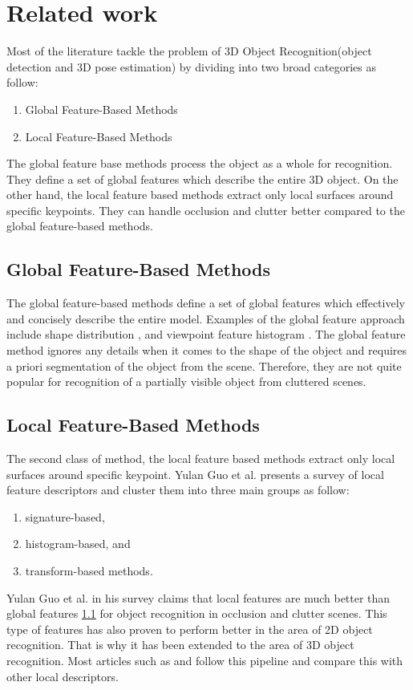 
\chapter{Related work}
\label{chap:relwork}

Most of the literature tackle the problem of 3D Object Recognition(object detection and 3D pose estimation) by dividing into two broad categories as follow:
\begin{enumerate}
\item Global Feature-Based Methods
\item Local Feature-Based Methods
\end{enumerate}

The global feature base methods process the object as a whole for recognition. They define a set of global features which describe the entire 3D object.
On the other hand, the local feature based methods extract only local surfaces around specific keypoints. They can handle occlusion and clutter better compared to the global feature-based methods.


\section{Global Feature-Based Methods} \label{global}
The global feature-based methods define a set of global features which effectively and concisely describe the entire model. Examples of the global feature approach include shape distribution \cite{shapedist}, and viewpoint feature histogram \cite{vfh}.
The global feature method ignores any details when it comes to the shape of the object and requires a priori segmentation of the object from the scene. 
Therefore, they are not quite popular for recognition of a partially visible object from cluttered scenes. 

\section{Local Feature-Based Methods}

The second class of method, the local feature based methods extract only local surfaces around specific keypoint. Yulan Guo et al. \cite{survey} presents a survey of local feature descriptors and cluster them into three main groups as follow:
\begin{enumerate}
\item signature-based,
\item histogram-based, and
\item transform-based methods.
\end{enumerate}

Yulan Guo et al. \cite{survey} in his survey claims that local features are much better than global features \ref{global} for object recognition in occlusion and clutter scenes. 
This type of features has also proven to perform better in the area of 2D object recognition. That is why it has been extended to the area of 3D object recognition. Most articles such as \cite{algFpfh} and \cite{repMatching} follow this pipeline and compare this with other local descriptors.

